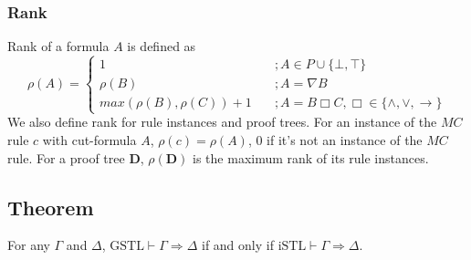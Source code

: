 \subsubsection{Rank} Rank of a formula $A$ is defined as
\[ \rho(A) = \begin{cases}
1 & \quad ; A \in P \cup \{ \bot, \top \} \\
\rho(B) & \quad ; A = \nabla B \\
max(\rho(B), \rho(C)) + 1 & \quad ; A = B \Box C, \Box \in \{ \land , \lor, \rightarrow \}
\end{cases} \]
We also define rank for rule instances and proof trees. For an instance of the $MC$ rule $c$ with cut-formula $A$, $\rho(c) = \rho(A)$, $0$ if it's not an instance of the $MC$ rule.
For a proof tree $\mathbf{D}$, $\rho(\mathbf{D})$ is the maximum rank of its rule instances.

\subsection{Theorem} For any $\Gamma$ and $\Delta$, $\text{GSTL} \vdash \Gamma \Rightarrow \Delta$ if and only if $\text{iSTL} \vdash \Gamma \Rightarrow \Delta$.

